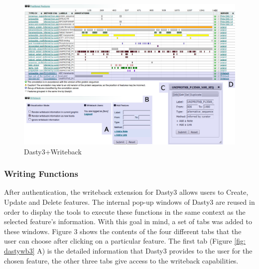 \begin{figure}[ht]
\centering
\includegraphics[width=6.5in]{figures/dasty3wbT.png} 
\caption{Dasty3+Writeback}  \label{fig: dasty+wb}
\end{figure}

\subsubsection{Writing Functions}
After authentication, the writeback extension for Dasty3 allows users to Create, Update and Delete features. The internal pop-up windows of Dasty3 are reused in order to display the tools to execute these functions in the same context as the selected feature's information. With this goal in mind, a set of tabs was added to these windows. Figure 3 shows the contents of the four different tabs that the user can choose after clicking on a particular feature. The first tab (Figure \ref{fig: dastywb3} A) is the detailed information that Dasty3 provides to the user for the chosen feature, the other three tabs give access to the writeback capabilities.

